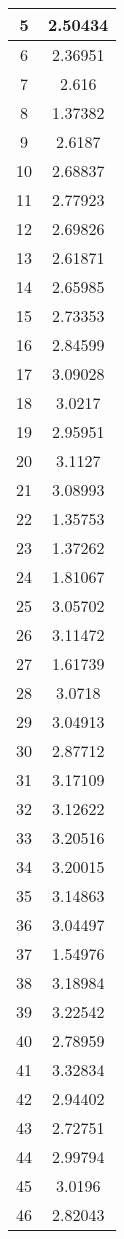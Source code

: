 \begin{table}[h]
\begin{subtable}[h]{2in}
{\begin{tabular}{|c|c|}
5	&	2.50434	\\	\hline
6	&	2.36951	\\	\hline
7	&	2.616	\\	\hline
8	&	1.37382	\\	\hline
9	&	2.6187	\\	\hline
10	&	2.68837	\\	\hline
11	&	2.77923	\\	\hline
12	&	2.69826	\\	\hline
13	&	2.61871	\\	\hline
14	&	2.65985	\\	\hline
15	&	2.73353	\\	\hline
16	&	2.84599	\\	\hline
17	&	3.09028	\\	\hline
18	&	3.0217	\\	\hline
19	&	2.95951	\\	\hline
20	&	3.1127	\\	\hline
21	&	3.08993	\\	\hline
22	&	1.35753	\\	\hline
23	&	1.37262	\\	\hline
24	&	1.81067	\\	\hline
25	&	3.05702	\\	\hline
26	&	3.11472	\\	\hline
27	&	1.61739	\\	\hline
28	&	3.0718	\\	\hline
29	&	3.04913	\\	\hline
30	&	2.87712	\\	\hline
31	&	3.17109	\\	\hline
32	&	3.12622	\\	\hline
33	&	3.20516	\\	\hline
34	&	3.20015	\\	\hline
35	&	3.14863	\\	\hline
36	&	3.04497	\\	\hline
37	&	1.54976	\\	\hline
38	&	3.18984	\\	\hline
39	&	3.22542	\\	\hline
40	&	2.78959	\\	\hline
41	&	3.32834	\\	\hline
42	&	2.94402	\\	\hline
43	&	2.72751	\\	\hline
44	&	2.99794	\\	\hline
45	&	3.0196	\\	\hline
46	&	2.82043	\\	\hline

\end{tabular}}
\end{subtable}
\end{table}
